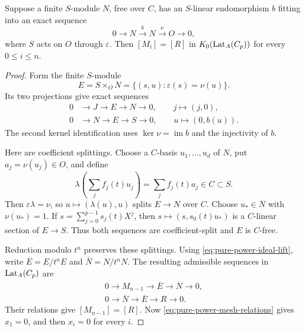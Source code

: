 \begin{proposition}\label{prop:pure-power-finite-module-criterion}
Suppose a finite \(S\)-module \(N\), free over \(C\), has an
\(S\)-linear endomorphism \(b\) fitting into an exact sequence
\begin{equation}\label{eq:pure-power-normalization-sequence}
 0\longrightarrow N\xrightarrow{b}N
 \xrightarrow{\nu}O\longrightarrow0,
\end{equation}
where \(S\) acts on \(O\) through \(\varepsilon\).
Then \([M_i]=[R]\) in \(K_0(\operatorname{Lat}_A(C_p))\) for every
\(0\le i\le n\).
\end{proposition}

\begin{proof}
Form the finite \(S\)-module
\[
 E=S\times_O N
   =\{(s,u):\varepsilon(s)=\nu(u)\}.
\]
Its two projections give exact sequences
\begin{equation}\label{eq:pure-power-fiber-product-sequences}
 \begin{split}
 0&\longrightarrow J\longrightarrow E\longrightarrow N
       \longrightarrow0,\qquad j\longmapsto(j,0),\\
 0&\longrightarrow N\longrightarrow E\longrightarrow S
       \longrightarrow0,\qquad u\longmapsto(0,b(u)).
 \end{split}
\end{equation}
The second kernel identification uses
\(\ker\nu=\operatorname{im}b\) and the injectivity of \(b\).

Here are coefficient splittings.  Choose a \(C\)-basis
\(u_1,\ldots,u_d\) of \(N\), put \(a_j=\nu(u_j)\in O\),
and define
\[
 \lambda\!\left(\sum_j f_j(t)u_j\right)
       =\sum_j f_j(t)a_j\in C\subset S.
\]
Then \(\varepsilon\lambda=\nu\), so
\(u\mapsto(\lambda(u),u)\) splits \(E\to N\) over \(C\).
Choose \(u_*\in N\) with \(\nu(u_*)=1\).  If
\(s=\sum_{j=0}^{p-1}s_j(t)X^j\), then
\(s\mapsto(s,s_0(t)u_*)\) is a \(C\)-linear section of
\(E\to S\).  Thus both sequences are coefficient-split and
\(E\) is \(C\)-free.

Reduction modulo \(t^n\) preserves these splittings.  Using
\eqref{eq:pure-power-ideal-lift}, write
\(\overline E=E/t^nE\) and \(\overline N=N/t^nN\).
The resulting admissible sequences in \(\operatorname{Lat}_A(C_p)\) are
\[
 \begin{gathered}
 0\longrightarrow M_{n-1}\longrightarrow\overline E
       \longrightarrow\overline N\longrightarrow0,\\
 0\longrightarrow\overline N\longrightarrow\overline E
       \longrightarrow R\longrightarrow0.
 \end{gathered}
\]
Their relations give \([M_{n-1}]=[R]\).  Now
\eqref{eq:pure-power-mesh-relations} gives \(x_1=0\), and then
\(x_i=0\) for every \(i\).
\end{proof}

